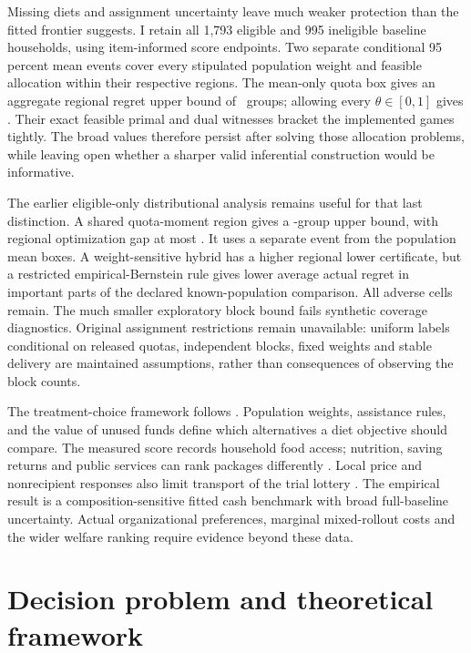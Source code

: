 \documentclass[11pt]{article}
\begin{document}
Missing diets and assignment uncertainty leave much weaker protection than the fitted frontier suggests. I retain all 1,793 eligible and 995 ineligible baseline households, using item-informed score endpoints. Two separate conditional 95 percent mean events cover every stipulated population weight and feasible allocation within their respective regions. The mean-only quota box gives an aggregate regional regret upper bound of \CommunityAggregateQuotaUpper\ groups; allowing every $\theta\in[0,1]$ gives \CommunityUnknownQuotaUpper. Their exact feasible primal and dual witnesses bracket the implemented games tightly. The broad values therefore persist after solving those allocation problems, while leaving open whether a sharper valid inferential construction would be informative.

The earlier eligible-only distributional analysis remains useful for that last distinction. A shared quota-moment region gives a \QuotaMeanLoss-group upper bound, with regional optimization gap at most \QuotaRegionalMeanGap. It uses a separate event from the population mean boxes. A weight-sensitive hybrid has a higher regional lower certificate, but a restricted empirical-Bernstein rule gives lower average actual regret in important parts of the declared known-population comparison. All adverse cells remain. The much smaller exploratory block bound fails synthetic coverage diagnostics. Original assignment restrictions remain unavailable: uniform labels conditional on released quotas, independent blocks, fixed weights and stable delivery are maintained assumptions, rather than consequences of observing the block counts.

The treatment-choice framework follows \citet{manski2004,manski2007,stoye2007,kitagawa2018}. Population weights, assistance rules, and the value of unused funds define which alternatives a diet objective should compare. The measured score records household food access; nutrition, saving returns and public services can rank packages differently \citep{curriegahvari2008,banerjeeduflo2007,haushofer2016}. Local price and nonrecipient responses also limit transport of the trial lottery \citep{cunha2019,egger2022}. The empirical result is a composition-sensitive fitted cash benchmark with broad full-baseline uncertainty. Actual organizational preferences, marginal mixed-rollout costs and the wider welfare ranking require evidence beyond these data.

\section{Decision problem and theoretical framework}
\end{document}
